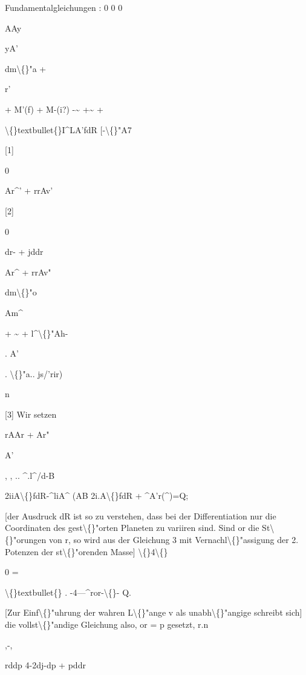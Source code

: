 \documentclass[10pt,a4paper]{article}
\begin{document}

Fundamentalgleichungen :
0
0
0

AAy

yA'

dm\textbackslash\{\}"a +

r'

+ M'(f)
+ M-(i?)
-\textasciitilde{}
+\textasciitilde{} +

\textbackslash\{\}textbullet\{\}I\textasciicircum{}LA'fdR [-\textbackslash\{\}"A7

[1]

0

Ar\textasciicircum{}' + rrAv'

[2]

0

dr- + jddr

Ar\textasciicircum{} + rrAv"

dm\textbackslash\{\}"o

Am\textasciicircum{}

+ \textasciitilde{} + l\textasciicircum{}\textbackslash\{\}"Ah-

. A'

. \textbackslash\{\}"a.. js/'rir)

n

[3]
Wir setzen

rAAr + Ar"

A'

,
, .. \textasciicircum{}.l\textasciicircum{}/d-B

2iiA\textbackslash\{\}fdR-\textasciicircum{}liA\textasciicircum{}
(AB
2i.A\textbackslash\{\}fdR + \textasciicircum{}A'r(\textasciicircum{})=Q;

[der Ausdruck dR ist so zu verstehen, dass bei der Differentiation nur die
Coordinaten des gest\textbackslash\{\}"orten Planeten zu variiren sind.
Sind or die St\textbackslash\{\}"orungen von r, so wird aus der Gleichung 3 mit Vernachl\textbackslash\{\}"assigung der 2. Potenzen der st\textbackslash\{\}"orenden Masse]
\textbackslash\{\}4\textbackslash\{\}

0 =

\textbackslash\{\}textbullet\{\} . -4---\textasciicircum{}ror-\textbackslash\{\}- Q.

[Zur Einf\textbackslash\{\}"uhrung
der wahren
L\textbackslash\{\}"ange v als unabh\textbackslash\{\}"angige
schreibt sich] die vollst\textbackslash\{\}"andige Gleichung also, or = p gesetzt,
r.n

,-,

rddp 4-2dj-dp + pddr
\end{document}
